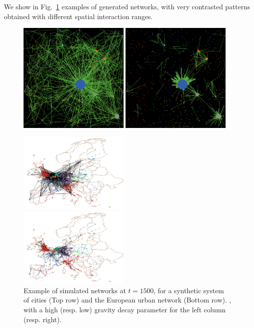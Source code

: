 \documentclass[11pt]{article}
\begin{document}
We show in Fig.~\ref{fig:example} examples of generated networks, with very contrasted patterns obtained with different spatial interaction ranges.

\begin{figure}
    \includegraphics[width=0.48\textwidth]{figures/ex_alleq-highgravity_seed-12102_t1500.png}
    \includegraphics[width=0.48\textwidth]{figures/ex_alleq-lowgravity_seed-12102_t1500.png}\\
    \begin{mdframed}
    \includegraphics[width=0.48\textwidth]{figures/ex_real_highgravity_t1500.png}
    \end{mdframed}
    \begin{mdframed}
    \includegraphics[width=0.48\textwidth]{figures/ex_real_lowgravity_t1500.png}
    \end{mdframed}
    \caption{Example of simulated networks at $t=1500$, for a synthetic system of cities (Top row) and the European urban network (Bottom row). , with a high (resp. low) gravity decay parameter for the left column (resp. right).\label{fig:example}}
\end{figure}
\end{document}
